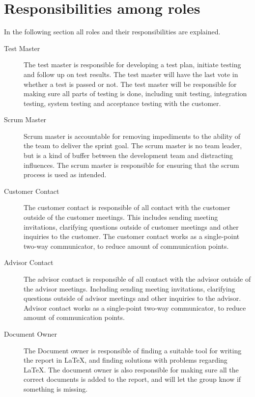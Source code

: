 \section{Responsibilities among roles}

In the following section all roles and their responsibilities are explained.

\begin{description}
	\item[Test Master] The test master is responsible for developing a test plan, initiate testing 
		and follow up on test results. The test master will have the last vote in 
		whether a test is passed or not. The test master will be responsible for making sure all 
		parts of testing is done, including unit testing, integration testing, system 
		testing and acceptance testing with the customer.
	
	\item[Scrum Master] Scrum master is accountable for removing impediments to the ability of the team 
		to deliver the sprint goal. The scrum master is no team leader, but is a kind 
		of buffer between the development team and distracting influences. The scrum master 
		is responsible for ensuring that the scrum process is 
		used as intended.

	\item[Customer Contact] The customer contact is responsible of all contact with the customer outside 
		of the customer meetings. This includes sending meeting invitations, clarifying 
		questions outside of customer meetings and other inquiries to the customer. 
		The customer contact works as a single-point two-way communicator, to reduce 
		amount of communication points. 

	\item[Advisor Contact] The advisor contact is responsible of all contact with the advisor outside 
		of the advisor meetings. Including sending meeting invitations, clarifying 
		questions outside of advisor meetings and other inquiries to the advisor. Advisor 
		contact works as a single-point two-way communicator, to reduce amount of 
		communication points.

	\item[Document Owner] The Document owner is responsible of finding a suitable tool for writing the report 
		in \LaTeX, and finding solutions with problems regarding \LaTeX. The document owner is also responsible for making sure all the correct 
		documents is added to the report, and will let the group know if something is missing. 


\end{description}
